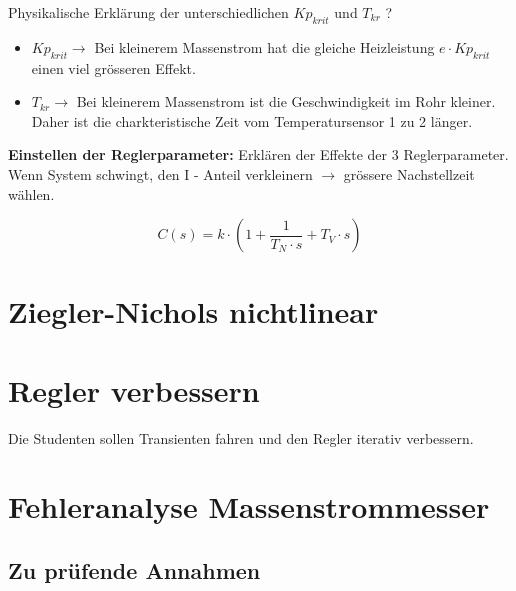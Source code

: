 \documentclass[a4paper,10pt,oneside]{article}
\begin{document}
Physikalische Erklärung der unterschiedlichen $Kp_{krit}$ und $T_{kr}$ ?
\begin{itemize}
\item $Kp_{krit} \rightarrow$ Bei kleinerem Massenstrom hat die gleiche Heizleistung $e \cdot Kp_{krit}$ einen viel grösseren Effekt.
\item $T_{kr} \rightarrow$ Bei kleinerem Massenstrom ist die Geschwindigkeit im Rohr kleiner. Daher ist die charkteristische Zeit vom Temperatursensor 1 zu 2 länger.
\end{itemize}

\textbf{Einstellen der Reglerparameter:} Erklären der Effekte der 3 Reglerparameter. Wenn System schwingt, den I - Anteil verkleinern $\rightarrow$ grössere Nachstellzeit wählen.

\begin{equation}
C(s) =k \cdot(1+\frac{1}{T_N \cdot s}+T_V\cdot s)
\end{equation}

\section{Ziegler-Nichols nichtlinear}

\section{Regler verbessern}

Die Studenten sollen Transienten fahren und den Regler iterativ verbessern.

\section{Fehleranalyse Massenstrommesser}

\parindent 0pt

\subsection{Zu prüfende Annahmen}
\end{document}
